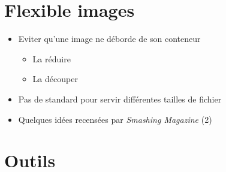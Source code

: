 \hypertarget{flexible-images}{%
\section{Flexible images}\label{flexible-images}}

\begin{itemize}
\tightlist
\item
  Eviter qu'une image ne déborde de son conteneur

  \begin{itemize}
  \tightlist
  \item
    La réduire
  \end{itemize}

  \begin{otherlanguage}{english}

\begin{Shaded}
\end{Shaded}

  \end{otherlanguage}

  \begin{itemize}
  \tightlist
  \item
    La découper
  \end{itemize}

  \begin{otherlanguage}{english}

\begin{Shaded}
\begin{Highlighting}[]
\end{Highlighting}
\end{Shaded}

  \end{otherlanguage}
\item
  Pas de standard pour servir différentes tailles de fichier
\item
  Quelques idées recensées par \emph{Smashing Magazine} (2)
\end{itemize}

\hypertarget{outils}{%
\section{Outils}\label{outils}}

